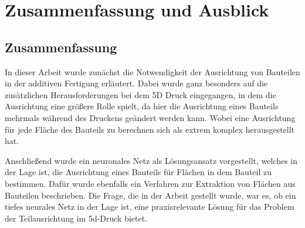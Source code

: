 
\chapter{Zusammenfassung und Ausblick}
\label{Zusammenfassung und Ausblick}

\section{Zusammenfassung}
\label{Zusammenfassung}

In dieser Arbeit wurde zunächst die Notwendigkeit der Ausrichtung von Bauteilen in der additiven Fertigung erläutert. Dabei wurde ganz besonders auf die zusätzlichen Herausforderungen bei dem 5D Druck eingegangen, in dem die Ausrichtung eine größere Rolle spielt,
da hier die Ausrichtung eines Bauteils mehrmals während des Druckens geändert werden kann. Wobei eine Ausrichtung für jede Fläche des Bauteils zu berechnen sich als extrem komplex herausgestellt hat.

\smallskip

Anschließend wurde ein neuronales Netz als Lösungsansatz vorgestellt, welches in der Lage ist, die Ausrichtung eines Bauteils für Flächen in dem Bauteil zu bestimmen. Dafür wurde ebenfalls ein Verfahren zur Extraktion von Flächen aus Bauteilen beschrieben.
Die Frage, die in der Arbeit gestellt wurde, war es, ob ein tiefes neurales Netz in der Lage ist, eine praxisrelevante Lösung für das Problem der Teilausrichtung im 5d-Druck bietet.

\smallskip

